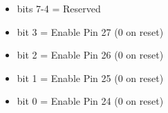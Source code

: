 \begin{itemize}
\item bits 7-4 = Reserved
\item bit 3 = Enable Pin 27 (0 on reset)
\item bit 2 = Enable Pin 26 (0 on reset)
\item bit 1 = Enable Pin 25 (0 on reset)
\item bit 0 = Enable Pin 24 (0 on reset)
\end{itemize}

